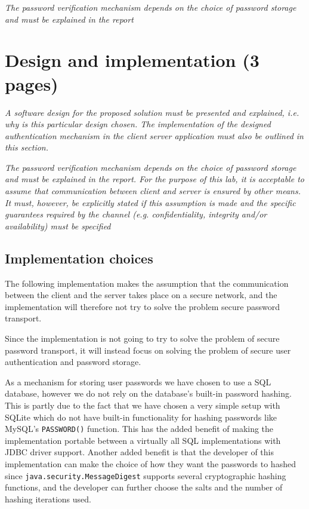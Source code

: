 \documentclass[12pt]{article}
\begin{document}
\textit{The password verification mechanism depends on the choice of password storage and must be explained in the report}
\newpage

\section{Design and implementation (3 pages)}
\label{sec:Design and implementation}

\textit{A software design for the proposed solution must be presented and explained, i.e. why is this particular design chosen. The implementation of the designed authentication mechanism in the client server application must also be outlined in this section.}

\textit{The password verification mechanism depends on the choice of password storage and must be explained in the report.
For the purpose of this lab, it is acceptable to assume that communication between client and server is ensured by other means. It must, however, be explicitly stated if this assumption is made and the specific guarantees required by the channel (e.g. confidentiality, integrity and/or availability) must be specified}

\subsection{Implementation choices}
\label{sub:Implementation choicesn}


The following implementation makes the assumption that the communication between the client and the server takes place on a secure network, and the implementation will therefore not try to solve the problem secure password transport.

Since the implementation is not going to try to solve the problem of secure password transport, it will instead focus on solving the problem of secure user authentication and password storage.

As a mechanism for storing user passwords we have chosen to use a SQL database, however we do not rely on the database's built-in password hashing. This is partly due to the fact that we have chosen a very simple setup with SQLite which do not have built-in functionality for hashing passwords like MySQL's \texttt{PASSWORD()} function. This has the added benefit of making the implementation portable between a virtually all SQL implementations with JDBC driver support. Another added benefit is that the developer of this implementation can make the choice of how they want the passwords to hashed since \texttt{java.security.MessageDigest} supports several cryptographic hashing functions, and the developer can further choose the salts and the number of hashing iterations used.
\end{document}
